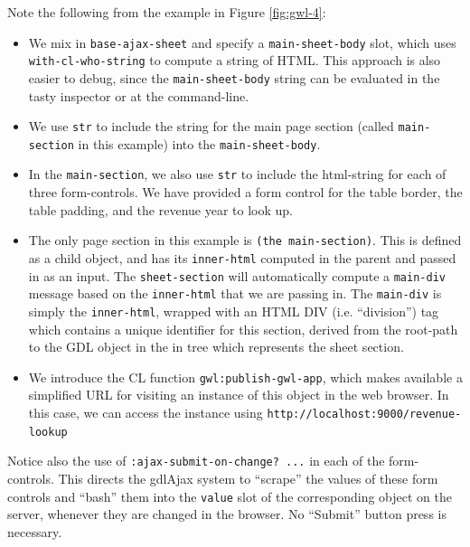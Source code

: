 \documentclass [11pt]{book}
\begin{document}
Note the following from the example in Figure 
\ref{fig:gwl-4}:

\begin{itemize}

\item We mix in \texttt{base-ajax-sheet} and specify a \texttt{main-sheet-body} slot, which uses \texttt{with-cl-who-string} to compute a string
                   of HTML. This approach is also easier to debug,
                   since the \texttt{main-sheet-body} string
                   can be evaluated in the tasty inspector or at the
                   command-line.

\item We use \texttt{str} to include the string for the main page
        section (called \texttt{main-section} in this example) into the \texttt{main-sheet-body}.

\item In the \texttt{main-section}, we also
        use \texttt{str} to include the html-string for each of
        three form-controls. We have provided a form control for the
        table border, the table padding, and the revenue year to look
        up.

\item The only page section in this example is \texttt{(the main-section)}. This is defined as a child object, and has its \texttt{inner-html} computed in the parent and passed in as an input. The \texttt{sheet-section} will automatically compute a \texttt{main-div} message based on the \texttt{inner-html} that we are passing in. The \texttt{main-div} is simply the \texttt{inner-html}, wrapped with
               an HTML DIV (i.e. ``division'') tag which contains a unique
               identifier for this section, derived from the root-path
               to the GDL object in the in tree which represents the
               sheet section.

\item We introduce the CL function \texttt{gwl:publish-gwl-app}, which makes available a simplified URL for visiting an instance of this
        object in the web browser. In this case, we can access the
        instance using \texttt{http://localhost:9000/revenue-lookup}

\end{itemize}





Notice also the use of \texttt{:ajax-submit-on-change? ...} in each of the form-controls. This directs the gdlAjax
	  system to ``scrape'' the values of these form controls
	  and ``bash'' them into the \texttt{value} slot of the corresponding object on the server, whenever
they are changed in the browser. No ``Submit'' button press is
necessary.
\end{document}
